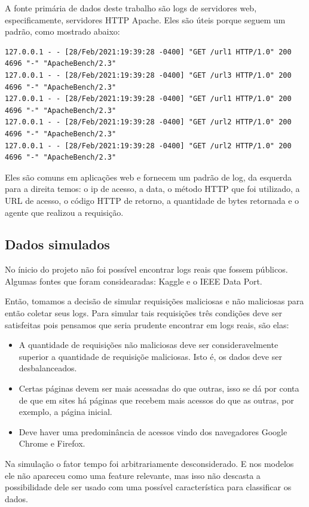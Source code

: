 A fonte primária de dados deste trabalho são logs de servidores web, especificamente,
servidores HTTP Apache. Eles são úteis porque seguem um padrão, como mostrado abaixo:

\begin{verbatim}
127.0.0.1 - - [28/Feb/2021:19:39:28 -0400] "GET /url1 HTTP/1.0" 200 4696 "-" "ApacheBench/2.3"
127.0.0.1 - - [28/Feb/2021:19:39:28 -0400] "GET /url3 HTTP/1.0" 200 4696 "-" "ApacheBench/2.3"
127.0.0.1 - - [28/Feb/2021:19:39:28 -0400] "GET /url1 HTTP/1.0" 200 4696 "-" "ApacheBench/2.3"
127.0.0.1 - - [28/Feb/2021:19:39:28 -0400] "GET /url2 HTTP/1.0" 200 4696 "-" "ApacheBench/2.3"
127.0.0.1 - - [28/Feb/2021:19:39:28 -0400] "GET /url2 HTTP/1.0" 200 4696 "-" "ApacheBench/2.3"
\end{verbatim}

Eles são comuns em aplicações web e fornecem um padrão de log, da esquerda para a direita temos:
o ip de acesso, a data, o método HTTP que foi utilizado, a URL de acesso, o código HTTP de retorno,
a quantidade de bytes retornada e o agente que realizou a requisição.


\subsection{Dados simulados}

No ínicio do projeto não foi possível encontrar logs reais que fossem públicos. Algumas fontes
que foram considearadas: Kaggle e o IEEE Data Port.

Então, tomamos a decisão de simular requisições maliciosas e não maliciosas para então coletar seus logs. 
Para simular tais requisições três condições deve ser satisfeitas pois pensamos que seria prudente encontrar
em logs reais, são elas:

\begin{itemize}
    \item A quantidade de requisições não maliciosas deve ser consideravelmente
    superior a quantidade de requisiçõe maliciosas. Isto é, os dados deve ser desbalanceados.
    \item Certas páginas devem ser mais acessadas do que outras, isso se dá por conta 
    de que em sites há páginas que recebem mais acessos do que as outras, por exemplo, a página inicial.
    \item Deve haver uma predominância de acessos vindo dos navegadores Google Chrome e Firefox.
\end{itemize}

Na simulação o fator tempo foi arbitrariamente desconsiderado. E nos modelos ele não apareceu 
como uma feature relevante, mas isso não descasta a possibilidade dele ser usado com uma possível
característica para classificar os dados.

